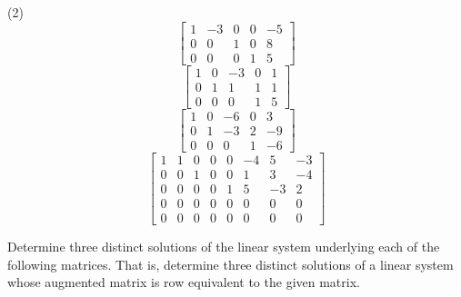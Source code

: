 \begin{tasks}[resume, style=enumerate](2)
\task
  \begin{displaymath}
    \begin{bmatrix}
      1 & -3 & 0 & 0 & -5 \\
      0 & 0 & 1 & 0 & 8 \\
      0 & 0 & 0 & 1 & 5
    \end{bmatrix}
  \end{displaymath}
\task
  \begin{displaymath}
    \begin{bmatrix}
      1 & 0 & -3 & 0 & 1 \\
      0 & 1 & 1 & 1 & 1 \\
      0 & 0 & 0 & 1 & 5
    \end{bmatrix}
  \end{displaymath}
\task
  \begin{displaymath}
    \begin{bmatrix}
      1 & 0 & -6 & 0 & 3 \\
      0 & 1 & -3 & 2 & -9 \\
      0 & 0 & 0 & 1 & -6
    \end{bmatrix}
  \end{displaymath}
\task
  \begin{displaymath}
    \begin{bmatrix}
      1 & 1 & 0 & 0 & 0 & -4 & 5 & -3 \\
      0 & 0 & 1 & 0 & 0 & 1 & 3 & -4 \\
      0 & 0 & 0 & 0 & 1 & 5 & -3 & 2 \\
      0 & 0 & 0 & 0 & 0 & 0 & 0 & 0 \\
      0 & 0 & 0 & 0 & 0 & 0 & 0 & 0
    \end{bmatrix}
  \end{displaymath}
\end{tasks}
Determine three distinct solutions of the linear system underlying
each of the following matrices.  That is, determine three distinct
solutions of a linear system whose augmented matrix is row equivalent
to the given matrix.
